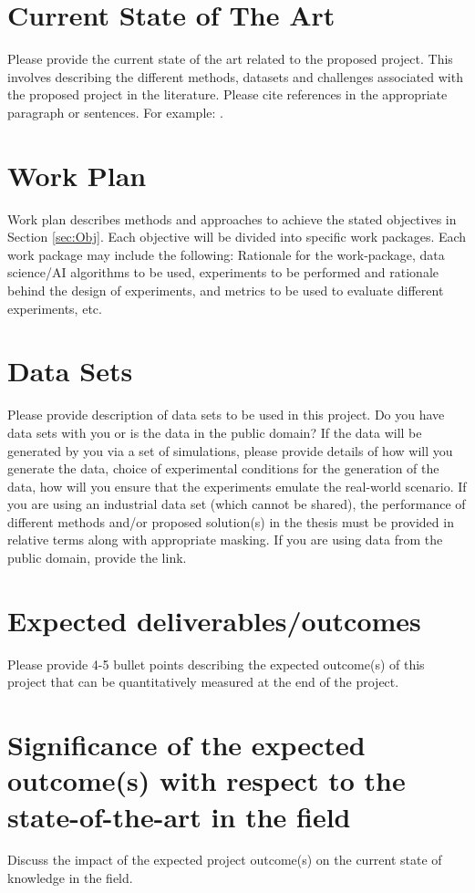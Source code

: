 \documentclass[12pt,a4paper]{article}
\begin{document}
\section{Current State of The Art}


Please provide the current state of the art related to the proposed project. This involves describing the different methods, datasets and challenges associated with the proposed project in the literature. Please cite references in the appropriate paragraph or sentences. For example: \cite{Elgamal}.

\section{Work Plan}
Work plan describes methods and approaches to achieve the stated objectives in Section \ref{sec:Obj}. Each objective will be divided into specific work packages. Each work package may include the following: Rationale for the work-package, data science/AI algorithms to be used, experiments to be performed and rationale behind the design of experiments, and metrics to be used to evaluate different experiments, etc. 

\section{Data Sets}
Please provide description of data sets to be used in this project. Do you have data sets with you or is the data in the public domain? If the data will be generated by you via a set of simulations, please provide details of how will you generate the data, choice of experimental conditions for the generation of the data, how will you ensure that the experiments emulate the real-world scenario. If you are using an industrial data set (which cannot be shared), the performance of different methods and/or proposed solution(s) in the thesis must be provided in relative terms along with appropriate masking. If you are using data from the public domain, provide the link. 

\section{Expected deliverables/outcomes}
Please provide 4-5 bullet points describing the expected outcome(s) of this project that can be quantitatively measured at the end of the project. 

\section{Significance of the expected outcome(s) with respect to the state-of-the-art in 
the field}
Discuss the impact of the expected project outcome(s) on the current state of knowledge in the field.
\end{document}
